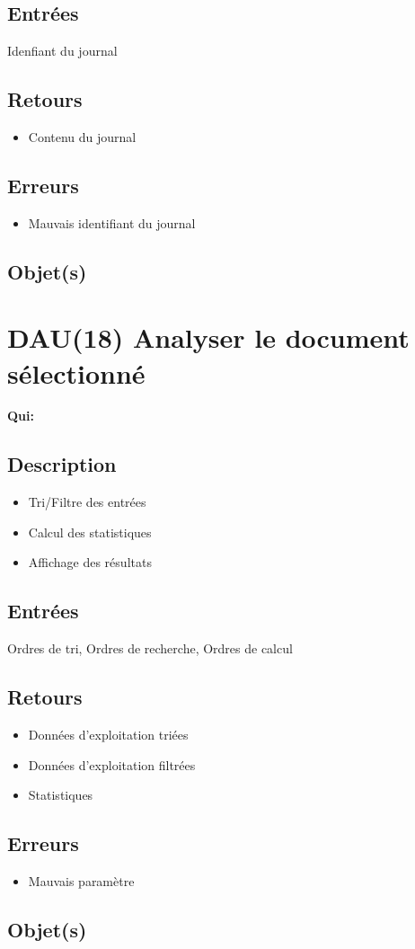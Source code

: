 	\subsection{Entrées}
		Idenfiant du journal

	\subsection{Retours}
	\begin{itemize}
		\item Contenu du journal
	\end{itemize}

	\subsection{Erreurs}
	\begin{itemize}
		\item Mauvais identifiant du journal \fatal
	\end{itemize}

	\subsection{Objet(s)}
		\syslog

\section{DAU(18) Analyser le document sélectionné}
	\textbf{Qui:} \urt

	\subsection{Description}
	\begin{itemize}
		\item Tri/Filtre des entrées
		\item Calcul des statistiques
		\item Affichage des résultats
	\end{itemize}

	\subsection{Entrées}
		Ordres de tri, Ordres de recherche, Ordres de calcul

	\subsection{Retours}
	\begin{itemize}
		\item Données d'exploitation triées
		\item Données d'exploitation filtrées
		\item Statistiques
	\end{itemize}

	\subsection{Erreurs}
	\begin{itemize}
		\item Mauvais paramètre \warning
	\end{itemize}

	\subsection{Objet(s)}
		\syslog

